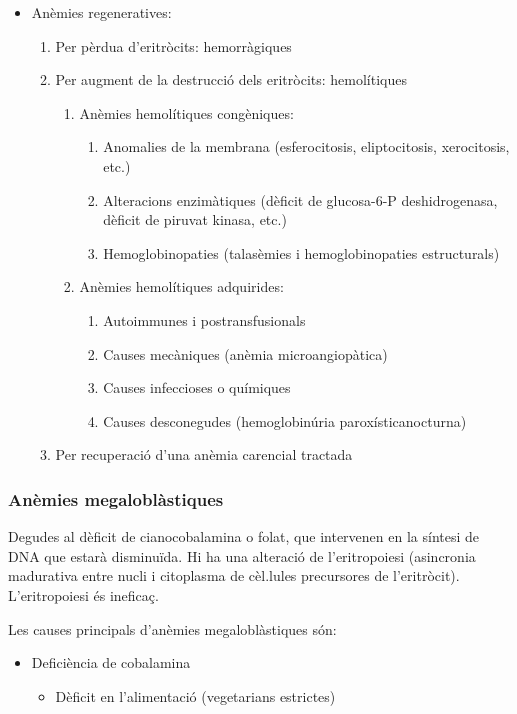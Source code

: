 \begin{itemize}
\begin{itemize}
\item Anèmies regeneratives:
  \begin{enumerate}
  \item Per pèrdua d’eritròcits: hemorràgiques
    
  \item Per augment de la destrucció dels eritròcits: hemolítiques
    \begin{enumerate}
    \item Anèmies hemolítiques congèniques:
      \begin{enumerate}
      \item Anomalies de la membrana (esferocitosis, eliptocitosis, xerocitosis, etc.)
      \item Alteracions enzimàtiques (dèficit de glucosa-6-P deshidrogenasa, dèficit de piruvat kinasa, etc.)
      \item Hemoglobinopaties (talasèmies i hemoglobinopaties estructurals)
      \end{enumerate}
    \item Anèmies hemolítiques adquirides:
      \begin{enumerate}
      \item Autoimmunes i postransfusionals
      \item Causes mecàniques (anèmia microangiopàtica)
      \item Causes infeccioses o químiques
      \item Causes desconegudes (hemoglobinúria paroxísticanocturna)
      \end{enumerate}
    \end{enumerate}
  \item Per recuperació d’una anèmia carencial tractada
  \end{enumerate}
\end{itemize}

\subsubsection{Anèmies megaloblàstiques}
Degudes al dèficit de cianocobalamina o folat, que intervenen en la síntesi de DNA que estarà disminuïda. Hi ha una alteració de l'eritropoiesi (asincronia madurativa entre nucli i citoplasma de cèl.lules precursores de l’eritròcit). L'eritropoiesi és ineficaç.

Les causes principals d'anèmies megaloblàstiques són:
\begin{itemize}
\item Deficiència de cobalamina
  \begin{itemize}
  \item Dèficit en l’alimentació (vegetarians estrictes)
    

\end{itemize}
\end{itemize}
\end{itemize}
